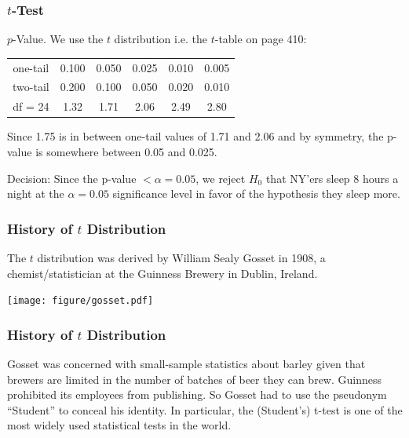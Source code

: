 \documentclass[handout]{beamer}
\newcommand{\blue}[1]{\textcolor{blue2}{#1}}
\begin{document}
\begin{frame}
\frametitle{$t$-Test}

$p$-Value. We use the $t$ distribution i.e. the $t$-table on page 410:
\begin{center}
\begin{tabular}{c|ccccc}
\hline
one-tail & 0.100 & 0.050 & 0.025 & 0.010 & 0.005\\
two-tail & 0.200 & 0.100 & 0.050 & 0.020 & 0.010\\
\hline
df = 24 & 1.32 & 1.71 & 2.06 & 2.49 & 2.80\\
\hline
\end{tabular}
\end{center}

Since 1.75 is in between one-tail values of 1.71 and 2.06 and by symmetry, the p-value is somewhere between 0.05 and 0.025. 

\vspace{0.5cm}

Decision: Since the p-value $< \alpha=0.05$, we reject $H_0$ that NY'ers sleep 8 hours a night at the $\alpha=0.05$ significance level in favor of the hypothesis they sleep more.
\end{frame}


\begin{frame}
\frametitle{History of $t$ Distribution}
The $t$ distribution was derived by William Sealy Gosset in 1908, a chemist/statistician at the Guinness Brewery in Dublin, Ireland.
\begin{center}
\texttt{[image: figure/gosset.pdf]}
\end{center}
\end{frame}


\begin{frame}
\frametitle{History of $t$ Distribution}
Gosset was concerned with \blue{small-sample statistics} about barley given that brewers are limited in the number of batches of beer they can brew.
\pause \vskip 0.5cm
Guinness prohibited its employees from publishing.  So Gosset had to use the pseudonym ``Student'' to conceal his identity.
\pause \vskip 0.5cm
In particular, the \blue{(Student's) t-test} is one of the most widely used statistical tests in the world.  
\end{frame}
\end{document}
